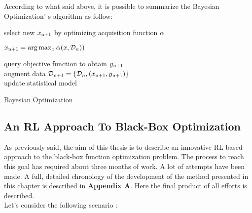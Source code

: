 According to what said above, it is possible to summarize the Bayesian Optimization' s algorithm as follow:

\begin{algorithm} [h!]
	
	{select new $x\textsubscript{n+1}$ by optimizing acquisition function $\alpha$ \\
		
		\begin{center}
			$x\textsubscript{n+1} = \arg \max_{x} \alpha(x, \mathcal{D}_n))$
		\end{center} 
	
	query objective function to obtain $y\textsubscript{n+1}$ \\
	augment data $\mathcal{D}\textsubscript{n+1} = \{\mathcal{D}_n, (x\textsubscript{n+1}, y\textsubscript{n+1})\}$ \\
	update statistical model 
	} 
	\caption{Bayesian Optimization\cite{DBLP:journals/pieee/ShahriariSWAF16}} 
	\label{BayAlgo}
\end{algorithm}

\subsection{An RL Approach To Black-Box Optimization} As previously said, the aim of this thesis is to describe an innovative RL based approach to the black-box function optimization problem. The process to reach this goal has required about three months of work. A lot of attempts have been made. A full, detailed chronology of the development of the method presented in this chapter is described in \textbf{Appendix A}. Here the final product of all efforts is described. \\

Let's consider the following scenario :

